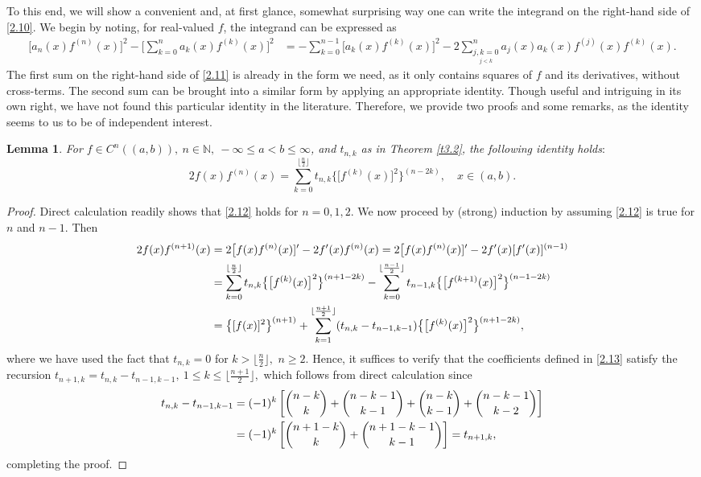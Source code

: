 \documentclass[reqno,10pt,centertags]{amsart}
\newcommand{\bbN}{{\mathbb{N}}}
\numberwithin{equation}{section}
\newtheorem{lemma}[theorem]{Lemma}
\theoremstyle{remark}
\begin{document}
To this end, we will show a convenient and, at first glance, somewhat surprising way one can write the integrand on the right-hand side of \eqref{2.10}. We begin by noting, for real-valued $f$, the integrand can be expressed as
\begin{align}\label{2.11}
\big[a_n(x)f^{(n)}(x)\big]^2-\bigg[\sum_{k=0}^n a_k(x) f^{(k)}(x)\bigg]^2&=-\sum_{k=0}^{n-1} \big[a_k(x)f^{(k)}(x)\big]^2 -2\sum_{\underset{j< k}{j,k=0}}^n a_j(x)a_k(x) f^{(j)}(x)f^{(k)}(x).
\end{align}
The first sum on the right-hand side of \eqref{2.11} is already in the form we need, as it only contains squares of $f$ and its derivatives, without cross-terms. The second sum can be brought into a similar form by applying an appropriate identity. Though useful and intriguing in its own right, we have not found this particular identity in the literature. Therefore, we provide two proofs and some remarks, as the identity seems to us to be of independent interest.

\begin{lemma}\label{l2.1}
For $f\in C^n((a,b)),\ n\in\bbN,\ -\infty\leq a<b\leq\infty$, and $t_{n,k}$ as in Theorem \ref{t3.2}, the following identity holds$:$
\begin{equation}\label{2.12}
2f(x)f^{(n)}(x)=\sum_{k=0}^{\lfloor \frac{n}{2}\rfloor} t_{n,k} \big\{\big[f^{(k)}(x)\big]^2\big\}^{(n-2k)},\quad x\in(a,b).
\end{equation}
\end{lemma}
\begin{proof}
Direct calculation readily shows that \eqref{2.12} holds for $n=0,1,2$.
We now proceed by (strong) induction by assuming \eqref{2.12} is true for $n$ and $n-1$. Then
\begin{align}
2f(x)f^{(n+1)}(x)&=2\big[f(x)f^{(n)}(x)]'-2f'(x)f^{(n)}(x)=2\big[f(x)f^{(n)}(x)]'-2f'(x)[f'(x)]^{(n-1)} \notag\\
&=\sum_{k=0}^{\lfloor \frac{n}{2}\rfloor} t_{n,k} \big\{\big[f^{(k)}(x)\big]^2\big\}^{(n+1-2k)}-\sum_{k=0}^{\lfloor \frac{n-1}{2}\rfloor} t_{n-1,k} \big\{\big[f^{(k+1)}(x)\big]^2\big\}^{(n-1-2k)}  \notag\\
&=\big\{[f(x)]^2\big\}^{(n+1)}+\sum_{k=1}^{\lfloor \frac{n+1}{2}\rfloor} (t_{n,k} - t_{n-1,k-1}) \big\{\big[f^{(k)}(x)\big]^2\big\}^{(n+1-2k)},
\end{align}
where we have used the fact that $t_{n,k}=0$ for $k>\lfloor\tfrac{n}{2}\rfloor,$ $n\geq2$.
Hence, it suffices to verify that the coefficients defined in \eqref{2.13} satisfy the recursion $t_{n+1,k}=t_{n,k}-t_{n-1,k-1},\ 1\leq k\leq \lfloor \tfrac{n+1}{2}\rfloor,$
which follows from direct calculation since
\begin{align}
t_{n,k}-t_{n-1,k-1}&=(-1)^k \left[\binom{n-k}{k}+\binom{n-k-1}{k-1} +\binom{n-k}{k-1}+\binom{n-k-1}{k-2} \right] \notag\\
&=(-1)^k \left[\binom{n+1-k}{k}+\binom{n+1-k-1}{k-1} \right] =t_{n+1,k},
\end{align}
completing the proof.
\end{proof}
\end{document}
